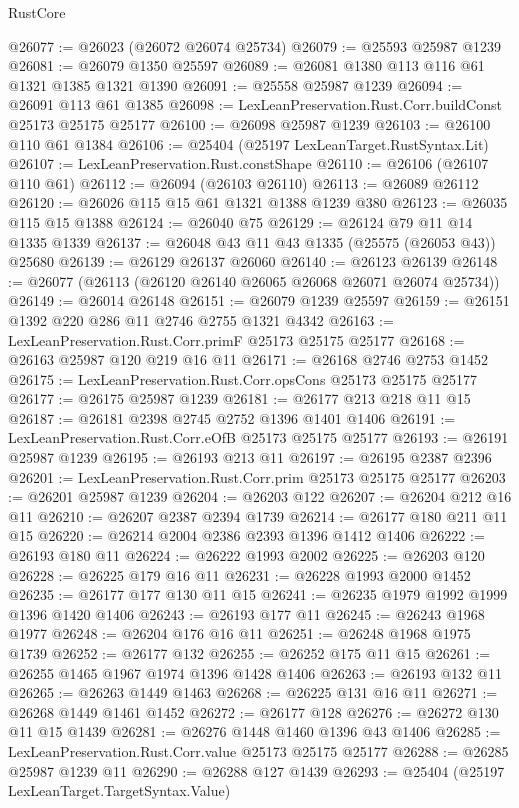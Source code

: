 \begin{lexlean}{RustCore}
\begin{coremodule}
@26077 := @26023 (@26072 @26074 @25734)
@26079 := @25593 @25987 @1239
@26081 := @26079 @1350 @25597
@26089 := @26081 @1380 @113 @116 @61 @1321 @1385 @1321 @1390
@26091 := @25558 @25987 @1239
@26094 := @26091 @113 @61 @1385
@26098 := LexLeanPreservation.Rust.Corr.buildConst @25173 @25175 @25177
@26100 := @26098 @25987 @1239
@26103 := @26100 @110 @61 @1384
@26106 := @25404 (@25197 LexLeanTarget.RustSyntax.Lit)
@26107 := LexLeanPreservation.Rust.constShape
@26110 := @26106 (@26107 @110 @61)
@26112 := @26094 (@26103 @26110)
@26113 := @26089 @26112
@26120 := @26026 @115 @15 @61 @1321 @1388 @1239 @380
@26123 := @26035 @115 @15 @1388
@26124 := @26040 @75
@26129 := @26124 @79 @11 @14 @1335 @1339
@26137 := @26048 @43 @11 @43 @1335 (@25575 (@26053 @43)) @25680
@26139 := @26129 @26137 @26060
@26140 := @26123 @26139
@26148 := @26077 (@26113 (@26120 @26140 @26065 @26068 @26071 @26074 @25734))
@26149 := @26014 @26148
@26151 := @26079 @1239 @25597
@26159 := @26151 @1392 @220 @286 @11 @2746 @2755 @1321 @4342
@26163 := LexLeanPreservation.Rust.Corr.primF @25173 @25175 @25177
@26168 := @26163 @25987 @120 @219 @16 @11
@26171 := @26168 @2746 @2753 @1452
@26175 := LexLeanPreservation.Rust.Corr.opsCons @25173 @25175 @25177
@26177 := @26175 @25987 @1239
@26181 := @26177 @213 @218 @11 @15
@26187 := @26181 @2398 @2745 @2752 @1396 @1401 @1406
@26191 := LexLeanPreservation.Rust.Corr.eOfB @25173 @25175 @25177
@26193 := @26191 @25987 @1239
@26195 := @26193 @213 @11
@26197 := @26195 @2387 @2396
@26201 := LexLeanPreservation.Rust.Corr.prim @25173 @25175 @25177
@26203 := @26201 @25987 @1239
@26204 := @26203 @122
@26207 := @26204 @212 @16 @11
@26210 := @26207 @2387 @2394 @1739
@26214 := @26177 @180 @211 @11 @15
@26220 := @26214 @2004 @2386 @2393 @1396 @1412 @1406
@26222 := @26193 @180 @11
@26224 := @26222 @1993 @2002
@26225 := @26203 @120
@26228 := @26225 @179 @16 @11
@26231 := @26228 @1993 @2000 @1452
@26235 := @26177 @177 @130 @11 @15
@26241 := @26235 @1979 @1992 @1999 @1396 @1420 @1406
@26243 := @26193 @177 @11
@26245 := @26243 @1968 @1977
@26248 := @26204 @176 @16 @11
@26251 := @26248 @1968 @1975 @1739
@26252 := @26177 @132
@26255 := @26252 @175 @11 @15
@26261 := @26255 @1465 @1967 @1974 @1396 @1428 @1406
@26263 := @26193 @132 @11
@26265 := @26263 @1449 @1463
@26268 := @26225 @131 @16 @11
@26271 := @26268 @1449 @1461 @1452
@26272 := @26177 @128
@26276 := @26272 @130 @11 @15 @1439
@26281 := @26276 @1448 @1460 @1396 @43 @1406
@26285 := LexLeanPreservation.Rust.Corr.value @25173 @25175 @25177
@26288 := @26285 @25987 @1239 @11
@26290 := @26288 @127 @1439
@26293 := @25404 (@25197 LexLeanTarget.TargetSyntax.Value)

\end{coremodule}
\end{lexlean}

